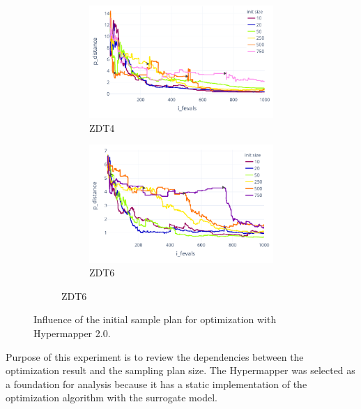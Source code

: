 \begin{figure}[!h]
        
        \begin{subfigure}{\textwidth}
            \begin{subfigure}{0.45\textwidth}
                \includegraphics[width=\textwidth]{content/images/hypermapper_zdt4_start_set}
                \caption{ZDT4}
                \label{fig:hmapper_zdt4_start_set}
            \end{subfigure}
            \begin{subfigure}{0.45\textwidth}
                \includegraphics[width=\textwidth]{content/images/hypermapper_zdt6_start_set}
                \caption{ZDT6}
                \label{fig:hmapper_zdt6_start_set}
            \end{subfigure}
        \end{subfigure} 

        \caption[Influence of the initial sample plan for optimization with Hypermapper 2.0.]{Influence of the initial sample plan for optimization with Hypermapper 2.0.}
        \label{fig:hmapper_start_set}    
    \end{figure}
    Purpose of this experiment is to review the dependencies between the optimization result and the sampling plan size. The Hypermapper was selected as a foundation for analysis because it has a static implementation of the optimization algorithm with the surrogate model.

